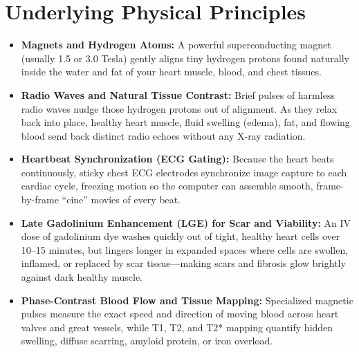 \section{Underlying Physical Principles}
\begin{itemize}
\item \textbf{Magnets and Hydrogen Atoms:} A powerful superconducting magnet (usually 1.5 or 3.0 Tesla) gently aligns tiny hydrogen protons found naturally inside the water and fat of your heart muscle, blood, and chest tissues.
\item \textbf{Radio Waves and Natural Tissue Contrast:} Brief pulses of harmless radio waves nudge those hydrogen protons out of alignment. As they relax back into place, healthy heart muscle, fluid swelling (edema), fat, and flowing blood send back distinct radio echoes without any X-ray radiation.
\item \textbf{Heartbeat Synchronization (ECG Gating):} Because the heart beats continuously, sticky chest ECG electrodes synchronize image capture to each cardiac cycle, freezing motion so the computer can assemble smooth, frame-by-frame ``cine'' movies of every beat.
\item \textbf{Late Gadolinium Enhancement (LGE) for Scar and Viability:} An IV dose of gadolinium dye washes quickly out of tight, healthy heart cells over 10--15 minutes, but lingers longer in expanded spaces where cells are swollen, inflamed, or replaced by scar tissue---making scars and fibrosis glow brightly against dark healthy muscle.
\item \textbf{Phase-Contrast Blood Flow and Tissue Mapping:} Specialized magnetic pulses measure the exact speed and direction of moving blood across heart valves and great vessels, while T1, T2, and T2* mapping quantify hidden swelling, diffuse scarring, amyloid protein, or iron overload.
\end{itemize}

